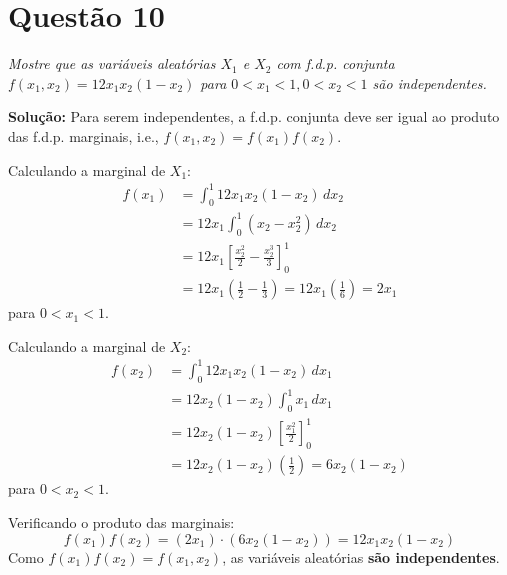 \documentclass[12pt, a4paper]{article}
\begin{document}
\section*{Questão 10}
\textit{Mostre que as variáveis aleatórias $X_1$ e $X_2$ com f.d.p. conjunta $f(x_1,x_2) = 12x_1x_2(1-x_2)$ para $0<x_1<1, 0<x_2<1$ são independentes.}

\textbf{Solução:}
Para serem independentes, a f.d.p. conjunta deve ser igual ao produto das f.d.p. marginais, i.e., $f(x_1, x_2) = f(x_1)f(x_2)$.

Calculando a marginal de $X_1$:
\begin{align*}
f(x_1) &= \int_{0}^{1} 12x_1x_2(1-x_2) \,dx_2 \\
       &= 12x_1 \int_{0}^{1} (x_2 - x_2^2) \,dx_2 \\
       &= 12x_1 \left[\frac{x_2^2}{2} - \frac{x_2^3}{3}\right]_{0}^{1} \\
       &= 12x_1 \left(\frac{1}{2} - \frac{1}{3}\right) = 12x_1 \left(\frac{1}{6}\right) = 2x_1
\end{align*}
para $0 < x_1 < 1$.

Calculando a marginal de $X_2$:
\begin{align*}
f(x_2) &= \int_{0}^{1} 12x_1x_2(1-x_2) \,dx_1 \\
       &= 12x_2(1-x_2) \int_{0}^{1} x_1 \,dx_1 \\
       &= 12x_2(1-x_2) \left[\frac{x_1^2}{2}\right]_{0}^{1} \\
       &= 12x_2(1-x_2) \left(\frac{1}{2}\right) = 6x_2(1-x_2)
\end{align*}
para $0 < x_2 < 1$.

Verificando o produto das marginais:
$$ f(x_1)f(x_2) = (2x_1) \cdot (6x_2(1-x_2)) = 12x_1x_2(1-x_2) $$
Como $f(x_1)f(x_2) = f(x_1, x_2)$, as variáveis aleatórias \textbf{são independentes}.
\end{document}
